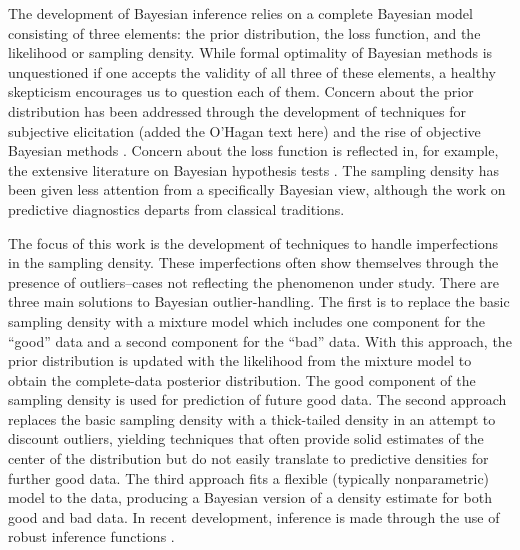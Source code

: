 \documentclass[12pt]{article}
\newcommand{\red}[1]{{\color{red}#1}}
\newcommand{\blue}[1]{{\color{blue}#1}}
\begin{document}
The development of Bayesian inference relies on a complete Bayesian model consisting of 
three elements:  the prior distribution, the loss function, and the likelihood or sampling density.  While formal
optimality of Bayesian methods is unquestioned if one accepts the validity of all three of these elements, 
 a healthy skepticism encourages us to question each of them.  Concern about the prior distribution has
been addressed through the development of techniques for subjective elicitation \citep{garthwaite2005, ohagan2006} \blue{(added the O'Hagan text here)} and
the rise of objective Bayesian methods \citep{berger2006}.  
Concern about the loss function is reflected in, for example, the
extensive literature on Bayesian hypothesis tests \citep{kass1995}.  
The sampling density has been given less attention from a specifically
Bayesian view, although the work on predictive diagnostics \citep{box1980} departs from classical
traditions.  

The focus of this work is the development of techniques to handle imperfections in the sampling density.  These imperfections often show
themselves through the presence of outliers--cases %
not reflecting the phenomenon under
study. %
There are three main solutions to Bayesian outlier-handling.  The first is to replace the basic sampling
density with a mixture model which includes one component for the ``good'' data and a second 
component for the ``bad'' data.  With this approach, the prior distribution is updated with the likelihood
from the mixture model to obtain the complete-data posterior distribution.  The good component of
the sampling density is used for prediction of future good data.  The second approach replaces the
basic sampling density with a thick-tailed density in an attempt to discount outliers, yielding techniques that 
often provide solid estimates of the center of the distribution but 
do not easily translate to predictive
densities for further good data.  The third approach fits a flexible (typically nonparametric) model to 
the data, producing a Bayesian version of a density estimate for both good and bad data.  In recent 
development, inference 
is made through the use of robust inference functions \citep[][in press]{lee2013}.  
\end{document}
